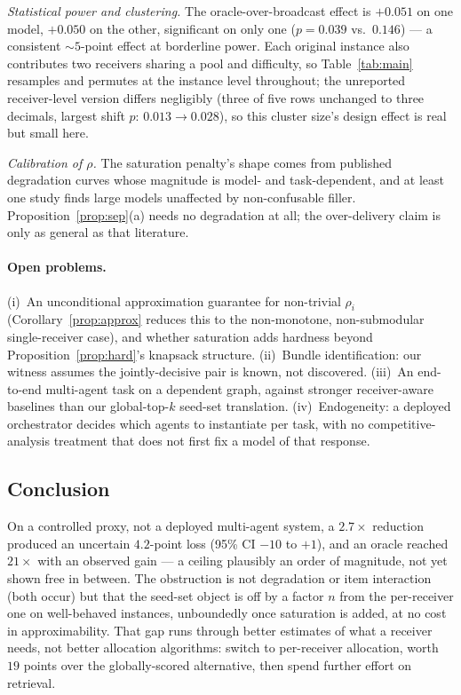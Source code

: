 \documentclass[sigconf,anonymous]{aamas}
\theoremstyle{remark}
\begin{document}
\emph{Statistical power and clustering.} The oracle-over-broadcast
effect is $+0.051$ on one model, $+0.050$ on the other, significant on
only one ($p=0.039$ vs.\ $0.146$) --- a consistent $\sim5$-point effect
at borderline power. Each original instance also contributes two
receivers sharing a pool and difficulty, so Table~\ref{tab:main}
resamples and permutes at the instance level throughout; the
unreported receiver-level version differs negligibly (three of five
rows unchanged to three decimals, largest shift $p{:}\,0.013\to0.028$),
so this cluster size's design effect is real but small here.

\emph{Calibration of $\rho$.} The saturation penalty's shape comes from
published degradation curves whose magnitude is model- and
task-dependent, and at least one study finds large models unaffected
by non-confusable filler. Proposition~\ref{prop:sep}(a) needs no
degradation at all; the over-delivery claim is only as general as that
literature.

\paragraph{Open problems.} (i)~An unconditional approximation guarantee
for non-trivial $\rho_i$ (Corollary~\ref{prop:approx} reduces this to
the non-monotone, non-submodular single-receiver case), and whether
saturation adds hardness beyond Proposition~\ref{prop:hard}'s knapsack
structure. (ii)~Bundle identification: our witness assumes the
jointly-decisive pair is known, not discovered. (iii)~An end-to-end
multi-agent task on a dependent graph, against stronger receiver-aware
baselines than our global-top-$k$ seed-set translation. (iv)~Endogeneity:
a deployed orchestrator decides which agents to instantiate per task,
with no competitive-analysis treatment that does not first fix a model
of that response.

\subsection{Conclusion}

On a controlled proxy, not a deployed multi-agent system, a
$2.7\times$ reduction produced an uncertain $4.2$-point loss (95\% CI
$-10$ to $+1$), and an oracle reached $21\times$ with an observed gain
--- a ceiling plausibly an order of magnitude, not yet shown free in
between. The obstruction is not degradation or item interaction (both
occur) but that the seed-set object is off by a factor $n$ from the
per-receiver one on well-behaved instances, unboundedly once saturation
is added, at no cost in approximability. That gap runs through better
estimates of what a receiver needs, not better allocation algorithms:
switch to per-receiver allocation, worth $19$ points over the
globally-scored alternative, then spend further effort on retrieval.

\balance


\end{document}
